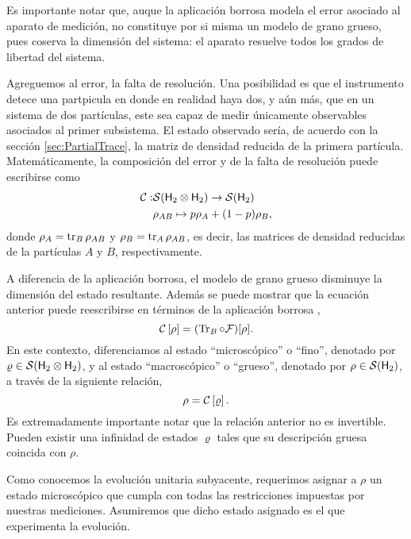 Es importante notar que, auque la aplicación borrosa modela el error asociado al aparato de medición, no constituye por si misma un modelo de grano grueso, pues coserva la dimensión del sistema: el aparato resuelve todos los grados de libertad del sistema.


Agreguemos al error, la falta de resolución. Una posibilidad es que el instrumento detece una partpicula en donde en realidad haya dos, y aún más, que en un sistema de dos partículas, este sea capaz de medir únicamente observables asociados al primer subsistema. El estado observado sería, de acuerdo con la sección \ref{sec:PartialTrace}, la matriz de densidad reducida de la primera partícula. Matemáticamente, la composición del error y de la falta de resolución puede escribirse como
\begin{align*}
\mathcal{C}:&\mathcal{S}({\sf H}_2 \otimes {\sf H}_2)\to \mathcal{S}({\sf H}_2)\nonumber\\
 &\rho_{AB} \mapsto p\rho_A+(1-p)\rho_B,
\end{align*}
donde $\rho_A=\tr_B \rho_{AB}$ y $\rho_B=\tr_A \rho_{AB}$, es decir, las matrices de densidad reducidas de la partículas $A$ y $B$, respectivamente.


A diferencia de la aplicación borrosa, el modelo de grano grueso disminuye la dimensión del estado resultante. Además se puede mostrar que la ecuación anterior puede reescribirse en términos de la aplicación borrosa \cite{FuzzyMeasurements},
\begin{equation}\label{eq:CG}
\mathcal{C}\left[\rho\right]=(\Tr_{B}\circ\mathcal{F})[\rho].
\end{equation}
En este contexto, diferenciamos al estado ``microscópico'' o ``fino'', denotado por $\varrho\in \mathcal{S}({\sf H}_2\otimes{\sf H}_2)$, y al estado ``macroscópico'' o ``grueso'', denotado por $\rho\in \mathcal{S}({\sf H}_2)$, a través de la siguiente relación,
\begin{equation*}
    \rho=\mathcal{C}\left[\varrho\right].
\end{equation*}
Es extremadamente importante notar que la relación anterior no es invertible. Pueden existir una infinidad de estados $\varrho$ tales que su descripción gruesa coincida con $\rho$.

Como conocemos la evolución unitaria subyacente, requerimos asignar a $\rho$ un estado microscópico que cumpla con todas las restricciones impuestas por nuestras mediciones. Asumiremos que dicho estado asignado es el que experimenta la evolución. 
